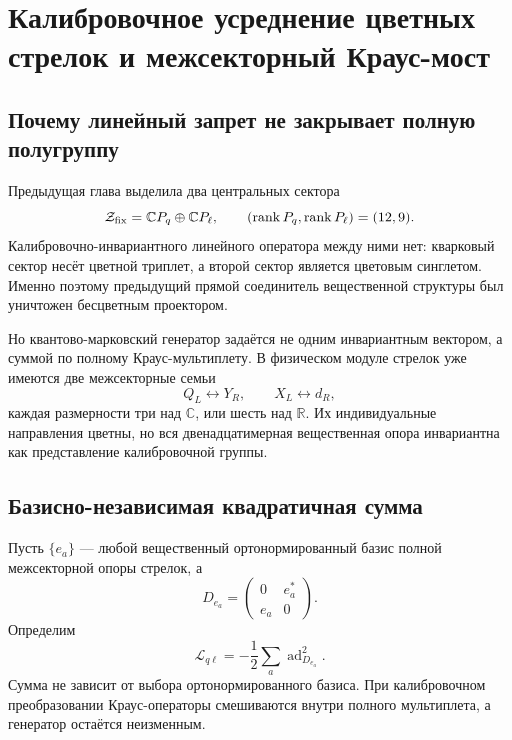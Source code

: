 \chapter{Калибровочное усреднение цветных стрелок и межсекторный Краус-мост}
\label{ch:v8-gauge-twirl-cross-sector-kraus-bridge-gate}

\section{Почему линейный запрет не закрывает полную полугруппу}

Предыдущая глава выделила два центральных сектора
\begin{equation}
 \mathcal Z_{\rm fix}=\mathbb CP_q\oplus\mathbb CP_\ell,
 \qquad (\operatorname{rank} P_q,\operatorname{rank} P_\ell)=(12,9).
\end{equation}
Калибровочно-инвариантного линейного оператора между ними нет: кварковый сектор несёт
цветной триплет, а второй сектор является цветовым синглетом. Именно поэтому
предыдущий прямой соединитель вещественной структуры был уничтожен бесцветным проектором.

Но квантово-марковский генератор задаётся не одним инвариантным вектором, а
суммой по полному Краус-мультиплету. В физическом модуле стрелок уже имеются
две межсекторные семьи
\begin{equation}
 Q_L\longleftrightarrow Y_R,
 \qquad
 X_L\longleftrightarrow d_R,
 \label{eq:v8-existing-cross-arrow-multiplets}
\end{equation}
каждая размерности три над $\mathbb C$, или шесть над $\mathbb R$. Их
индивидуальные направления цветны, но вся двенадцатимерная вещественная
опора инвариантна как представление калибровочной группы.

\section{Базисно-независимая квадратичная сумма}

Пусть $\{e_a\}$ --- любой вещественный ортонормированный базис полной
межсекторной опоры стрелок, а
\begin{equation}
 D_{e_a}=\begin{pmatrix}0&e_a^*\\e_a&0\end{pmatrix}.
\end{equation}
Определим
\begin{equation}
 \mathcal L_{q\ell}
 =-\frac12\sum_a\operatorname{ad}_{D_{e_a}}^2.
 \label{eq:v8-gauge-twirled-kraus-generator}
\end{equation}
Сумма не зависит от выбора ортонормированного базиса. При калибровочном
преобразовании Краус-операторы смешиваются внутри полного мультиплета, а
генератор остаётся неизменным.

